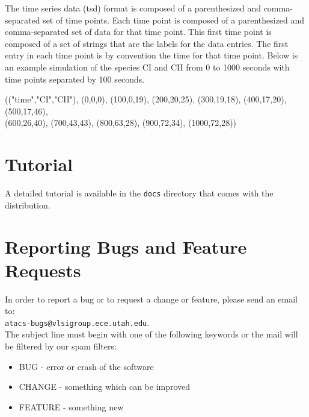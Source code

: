 \documentclass[titlepage,11pt]{article}
\begin{document}
\noindent
The time series data (tsd) format is composed of a
parenthesized and comma-separated set of time points. Each time
point is composed of a parenthesized and comma-separated set of
data for that time point. This first time point is composed of a
set of strings that are the labels for the data entries. The
first entry in each time point is by convention the time for that
time point. Below is an example simulation of the species CI and
CII from 0 to 1000 seconds with time points separated by 100
seconds. 

(("time","CI","CII"), (0,0,0), (100,0,19), (200,20,25), (300,19,18),
(400,17,20), (500,17,46), \\
(600,26,40), (700,43,43), (800,63,28), (900,72,34), (1000,72,28))

\section{Tutorial}

\noindent
A detailed 
tutorial
is available in the {\tt docs} directory that comes with the distribution.

\section{Reporting Bugs and Feature Requests}

\noindent
In order to report a bug or to request a change or feature, please
send an email to:\\ 
{\tt atacs-bugs@vlsigroup.ece.utah.edu}.\\
The subject line must begin with one of the following keywords or the
mail will be filtered by our spam filters:
\begin{itemize}
\item BUG - error or crash of the software
\item CHANGE - something which can be improved
\item FEATURE - something new
\end{itemize}
\end{document}
